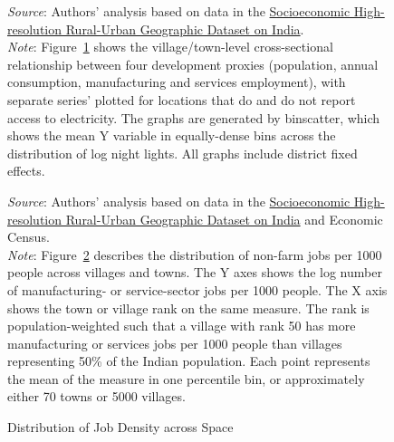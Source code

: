 \documentclass[12pt,letterpaper]{article}
\begin{document}
\begin{appendix}
\begin{figure}[H]
  \begin{adjustwidth}{2cm}{2cm}
    \footnotesize{\textit{Source}: Authors' analysis based on data in
      the \href{http://www.devdatalab.org/shrug}{Socioeconomic
        High-resolution Rural-Urban Geographic Dataset on
        India}. \\ \textit{Note}: Figure~\ref{fig:nl_xvars_pow} shows the
      village/town-level cross-sectional relationship between four
      development proxies (population, annual consumption, manufacturing and
      services employment), with separate series' plotted for
      locations that do and do not report access to electricity. The
      graphs are generated by binscatter, which shows the mean Y
      variable in equally-dense bins across the distribution of log
      night lights. All graphs include district fixed effects.}
  \end{adjustwidth}
  
\label{fig:nl_xvars_pow}
\end{figure}

\newpage
\begin{figure}[H]\caption{Distribution of Job Density across Space}
  \begin{center}
  \end{center}

\begin{adjustwidth}{2cm}{2cm}
  \footnotesize{\textit{Source}: Authors' analysis based on data in the
  \href{http://www.devdatalab.org/shrug}{Socioeconomic High-resolution
    Rural-Urban Geographic Dataset on India} and Economic Census. \\ \textit{Note}: Figure~\ref{fig:job_dist} describes the distribution
    of non-farm jobs per 1000 people across villages and towns. The Y
    axes shows the log number of manufacturing- or service-sector jobs
    per 1000 people. The X axis shows the town or village rank on the
    same measure. The rank is population-weighted such that a village
    with rank 50 has more manufacturing or services jobs per 1000
    people than villages representing 50\% of the Indian
    population. Each point represents the mean of the measure in one
    percentile bin, or approximately either 70 towns or 5000
    villages.}

\end{adjustwidth}

\label{fig:job_dist}
\end{figure}


\end{appendix}
\end{document}
